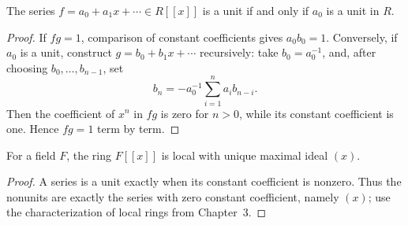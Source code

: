 \begin{proposition}
The series \(f=a_0+a_1x+\cdots\in R[[x]]\) is a unit if and only if \(a_0\)
is a unit in \(R\).
\end{proposition}
\begin{proof}
If \(fg=1\), comparison of constant coefficients gives
\(a_0b_0=1\).  Conversely, if \(a_0\) is a unit, construct
\(g=b_0+b_1x+\cdots\) recursively: take \(b_0=a_0^{-1}\), and, after
choosing \(b_0,\ldots,b_{n-1}\), set
\[
b_n=-a_0^{-1}\sum_{i=1}^n a_i b_{n-i}.
\]
Then the coefficient of \(x^n\) in \(fg\) is zero for \(n>0\), while its
constant coefficient is one.  Hence \(fg=1\) term by term.
\end{proof}
\begin{corollary}
For a field \(F\), the ring \(F[[x]]\) is local with unique maximal ideal
\((x)\).
\end{corollary}
\begin{proof}
A series is a unit exactly when its constant coefficient is nonzero.  Thus
the nonunits are exactly the series with zero constant coefficient, namely
\((x)\); use the characterization of local rings from Chapter~3.
\end{proof}

